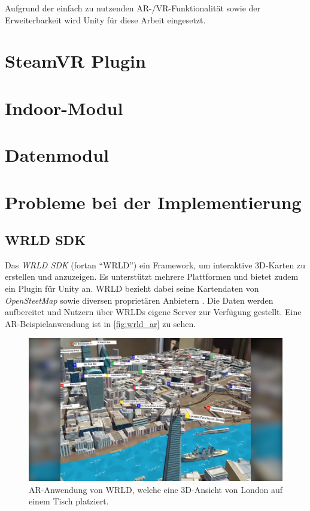 Aufgrund der einfach zu nutzenden AR-/VR-Funktionalität sowie der Erweiterbarkeit wird Unity für diese Arbeit eingesetzt.

\section{SteamVR Plugin}

\section{Indoor-Modul} %

\section{Datenmodul} %

\section{Probleme bei der Implementierung}

\subsection{WRLD SDK}

Das \emph{WRLD SDK} (fortan \enquote{WRLD}) ein Framework, um interaktive 3D-Karten zu erstellen und anzuzeigen.
Es unterstützt mehrere Plattformen und bietet zudem ein Plugin für Unity an.
WRLD bezieht dabei seine Kartendaten von \emph{OpenSteetMap} sowie diversen proprietären Anbietern \parencite{WRLD2018}.
Die Daten werden aufbereitet und Nutzern über WRLDs eigene Server zur Verfügung gestellt.
Eine AR-Beispielanwendung ist in \autoref{fig:wrld_ar} zu sehen.
\begin{figure}[t]
    \centering
    \includegraphics[width=\linewidth]{figures/wrld_ar-web-11_wide}
    \caption{AR-Anwendung von WRLD, welche eine 3D-Ansicht von London auf einem Tisch platziert. }
    \label{fig:wrld_ar}
\end{figure}

